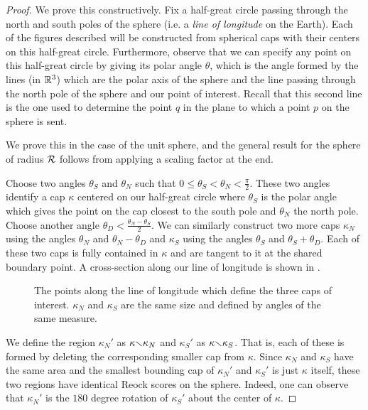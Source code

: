 \begin{proof}


  We prove this constructively.  Fix a half-great circle passing through the north and south poles of the sphere (i.e. a \textit{line of longitude} on the Earth).  Each of the figures described will be constructed from spherical caps with their centers on this half-great circle.  Furthermore, observe that we can specify any point on this half-great circle by giving its polar angle $\theta$, which is the angle formed by the lines (in $\mathbb{R}^3$) which are the polar axis of the sphere and the line passing through the north pole of the sphere and our point of interest.  Recall that this second line is the one used to determine the point $q$ in the plane to which a point $p$ on the sphere is sent.
  
  
  We prove this in the case of the unit sphere, and the general result for the sphere of radius $\mathcal{R}$ follows from applying a scaling factor at the end.
  
  Choose two angles $\theta_S$ and $\theta_N$ such that $0\leq\theta_S<\theta_N<\tfrac{\pi}{2}$.  These two angles identify a cap $\kappa$ centered on our half-great circle where $\theta_S$ is the polar angle which gives the point on the cap closest to the south pole and $\theta_N$ the north pole.  Choose another angle $\theta_D <\tfrac{\theta_N-\theta_S}{2}$.  We can similarly construct two more caps $\kappa_N$ using the angles $\theta_N$ and $\theta_N - \theta_D$ and $\kappa_S$ using the angles $\theta_S$ and $\theta_S+\theta_D$.  Each of these two caps is fully contained in $\kappa$ and are tangent to it at the shared boundary point.  A cross-section along our line of longitude is shown in .
  
  
  \begin{figure}[h]
  	\centering
  	
  	\caption{The points along the line of longitude which define the three caps of interest.  $\kappa_N$ and $\kappa_S$ are the same size and defined by angles of the same measure.}
  	\label{fig:reock_sphere_schema}
  \end{figure}
  
  We define the region $\kappa_N'$ as $\kappa{\smallsetminus}\kappa_N$ and $\kappa_S'$ as $\kappa{\smallsetminus}\kappa_S$.  That is, each of these is formed by deleting the corresponding smaller cap from $\kappa$.  Since $\kappa_N$ and $\kappa_S$ have the same area and the smallest bounding cap of 
  $\kappa_N'$ and $\kappa_S'$ is just $\kappa$ itself, these two regions have identical Reock scores on the sphere.  
  Indeed, one can observe that $\kappa_N'$ is the 
  $180$ degree rotation of $\kappa_S'$ about the center of $\kappa$.
  

\end{proof}
